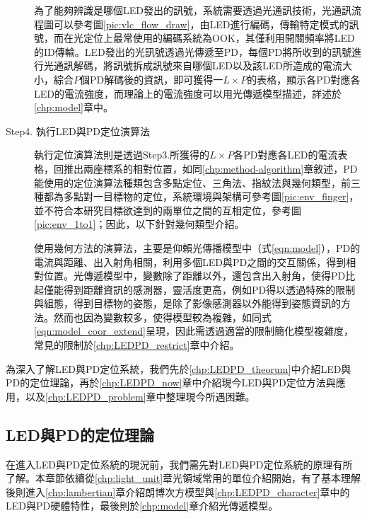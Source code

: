 \begin{description}
    \qquad
    為了能夠辨識是哪個LED發出的訊號，系統需要透過光通訊技術，光通訊流程圖可以參考圖\ref{pic:vlc_flow_draw}，由LED進行編碼，傳輸特定模式的訊號，而在光定位上最常使用的編碼系統為OOK，其僅利用開關頻率將LED的ID傳輸。LED發出的光訊號透過光傳遞至PD，每個PD將所收到的訊號進行光通訊解碼，將訊號拆成訊號來自哪個LED以及該LED所造成的電流大小，綜合$P$個PD解碼後的資訊，即可獲得一$L\times P$的表格，顯示各PD對應各LED的電流強度，而理論上的電流強度可以用光傳遞模型描述，詳述於\ref{chp:model}章中。
    
    \item[Step4. 執行LED與PD定位演算法] \hfill
    
    \qquad
    執行定位演算法則是透過Step3.所獲得的$L\times P$各PD對應各LED的電流表格，回推出兩座標系的相對位置，如同\ref{chp:method-algorithm}章敘述，PD能使用的定位演算法種類包含多點定位、三角法、指紋法與幾何類型，前三種都為多點對一目標物的定位，系統環境與架構可參考圖\ref{pic:env_finger}，並不符合本研究目標欲達到的兩單位之間的互相定位，參考圖\ref{pic:env_1to1}；因此，以下針對幾何類型介紹。

    \qquad
    使用幾何方法的演算法，主要是仰賴光傳播模型中（式\ref{eqn:model}），PD的電流與距離、出入射角相關，利用多個LED與PD之間的交互關係，得到相對位置。光傳遞模型中，變數除了距離以外，還包含出入射角，使得PD比起僅能得到距離資訊的感測器，靈活度更高，例如PD得以透過特殊的限制與組態，得到目標物的姿態\cite{case:orient}，是除了影像感測器以外能得到姿態資訊的方法。然而也因為變數較多，使得模型較為複雜，如同式\ref{eqn:model_coor_extend}呈現，因此需透過適當的限制簡化模型複雜度，常見的限制於\ref{chp:LEDPD_restrict}章中介紹。


\end{description}

\onehalfspacing

為深入了解LED與PD定位系統，我們先於\ref{chp:LEDPD_theorum}中介紹LED與PD的定位理論，再於\ref{chp:LEDPD_now}章中介紹現今LED與PD定位方法與應用，以及\ref{chp:LEDPD_problem}章中整理現今所遇困難。


\subsection{LED與PD的定位理論}  
\label{LEDPD:theorum}

    在進入LED與PD定位系統的現況前，我們需先對LED與PD定位系統的原理有所了解。本章節依續從\ref{chp:light_unit}章光領域常用的單位介紹開始，有了基本理解後則進入\ref{chp:lambertian}章介紹朗博次方模型與\ref{chp:LEDPD_character}章中的LED與PD硬體特性，最後則於\ref{chp:model}章介紹光傳遞模型。

